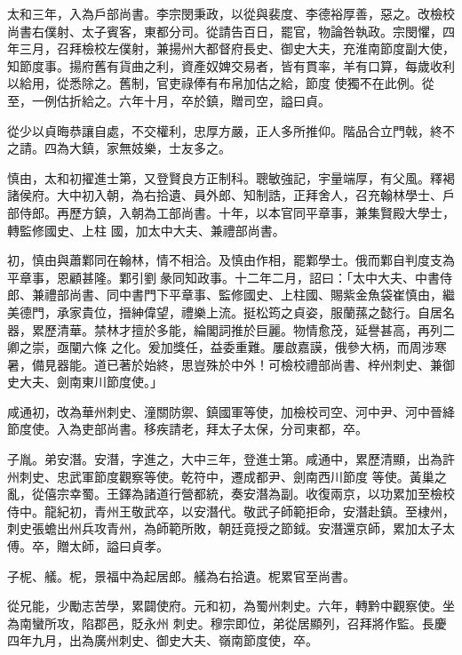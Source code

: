 \begin{pinyinscope}
 太和三年，入為戶部尚書。李宗閔秉政，以從與裴度、李德裕厚善，惡之。改檢校尚書右僕射、太子賓客，東都分司。從請告百日，罷官，物論咎執政。宗閔懼，四年三月，召拜檢校左僕射，兼揚州大都督府長史、御史大夫，充淮南節度副大使，知節度事。揚府舊有貨曲之利，資產奴婢交易者，皆有貫率，羊有口算，每歲收利以給用，從悉除之。舊制，官吏祿俸有布帛加估之給，節度
 使獨不在此例。從至，一例估折給之。六年十月，卒於鎮，贈司空，謚曰貞。



 從少以貞晦恭讓自處，不交權利，忠厚方嚴，正人多所推仰。階品合立門戟，終不之請。四為大鎮，家無妓樂，士友多之。



 慎由，太和初擢進士第，又登賢良方正制科。聰敏強記，宇量端厚，有父風。釋褐諸侯府。大中初入朝，為右拾遺、員外郎、知制誥，正拜舍人，召充翰林學士、戶部侍郎。再歷方鎮，入朝為工部尚書。十年，以本官同平章事，兼集賢殿大學士，轉監修國史、上柱
 國，加太中大夫、兼禮部尚書。



 初，慎由與蕭鄴同在翰林，情不相洽。及慎由作相，罷鄴學士。俄而鄴自判度支為平章事，恩顧甚隆。鄴引劉彖同知政事。十二年二月，詔曰：「太中大夫、中書侍郎、兼禮部尚書、同中書門下平章事、監修國史、上柱國、賜紫金魚袋崔慎由，繼美德門，承家貴位，搢紳偉望，禮樂上流。挺松筠之貞姿，服蘭蓀之懿行。自居名器，累歷清華。禁林才擅於多能，綸閣詞推於巨麗。物情愈茂，延譽甚高，再列二卿之崇，亟闡六條
 之化。爰加獎任，益委重難。屢啟嘉謨，俄參大柄，而周涉寒暑，備見器能。道已著於始終，思豈殊於中外！可檢校禮部尚書、梓州刺史、兼御史大夫、劍南東川節度使。」



 咸通初，改為華州刺史、潼關防禦、鎮國軍等使，加檢校司空、河中尹、河中晉絳節度使。入為吏部尚書。移疾請老，拜太子太保，分司東都，卒。



 子胤。弟安潛。安潛，字進之，大中三年，登進士第。咸通中，累歷清顯，出為許州刺史、忠武軍節度觀察等使。乾符中，遷成都尹、劍南西川節度
 等使。黃巢之亂，從僖宗幸蜀。王鐸為諸道行營都統，奏安潛為副。收復兩京，以功累加至檢校侍中。龍紀初，青州王敬武卒，以安潛代。敬武子師範拒命，安潛赴鎮。至棣州，刺史張蟾出州兵攻青州，為師範所敗，朝廷竟授之節鉞。安潛還京師，累加太子太傅。卒，贈太師，謚曰貞孝。



 子柅、艤。柅，景福中為起居郎。艤為右拾遺。柅累官至尚書。



 從兄能，少勵志苦學，累闢使府。元和初，為蜀州刺史。六年，轉黔中觀察使。坐為南蠻所攻，陷郡邑，貶永州
 刺史。穆宗即位，弟從居顯列，召拜將作監。長慶四年九月，出為廣州刺史、御史大夫、嶺南節度使，卒。




\end{pinyinscope}
